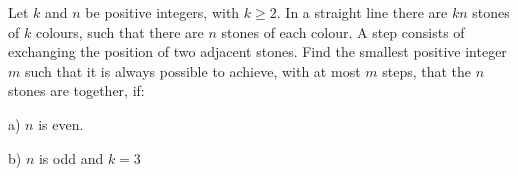 Let $k$ and $n$ be positive integers, with $k \geq 2$. In a straight line there are $kn$ stones of $k$ colours, such that there are $n$ stones of each colour. A step consists of exchanging the position of two adjacent stones. Find the smallest positive integer $m$ such that it is always possible to achieve, with at most $m$ steps, that the $n$ stones are together, if:

a) $n$ is even.

b) $n$ is odd and $k=3$
